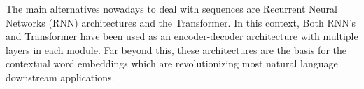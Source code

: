 The main alternatives nowadays to deal with sequences are Recurrent Neural Networks (RNN) architectures and the Transformer. 
In this context, Both RNN's and Transformer have been used as an encoder-decoder architecture with multiple layers in each module. Far beyond this, these architectures are the basis for the contextual word embeddings which are revolutionizing most natural language downstream applications.